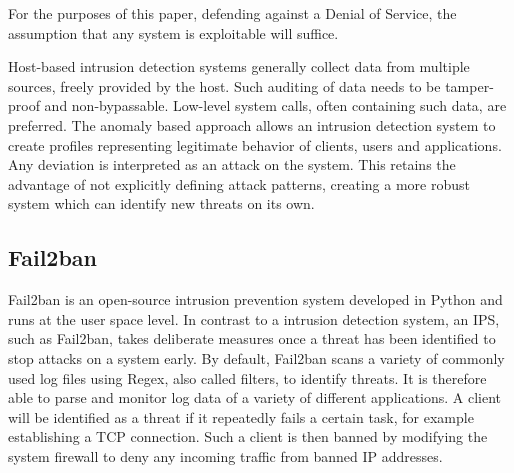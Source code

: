 For the purposes of this paper, defending against a Denial of Service, the assumption that any system is exploitable will suffice.

Host-based intrusion detection systems generally collect data from multiple sources, freely provided by the host.
Such auditing of data needs to be tamper-proof and non-bypassable.
Low-level system calls, often containing such data, are preferred.
The anomaly based approach allows an intrusion detection system to create profiles representing legitimate behavior of clients, users and applications.
Any deviation is interpreted as an attack on the system.
This retains the advantage of not explicitly defining attack patterns, creating a more robust system which can identify new threats on its own.\cite{HIDPS}

\subsection{Fail2ban}
Fail2ban is an open-source intrusion prevention system developed in Python and runs at the user space level.
In contrast to a intrusion detection system, an \ac{IPS}, such as Fail2ban, takes deliberate measures once a threat has been identified to stop attacks on a system early.
By default, Fail2ban scans a variety of commonly used log files using \ac{Regex}, also called filters, to identify threats.
It is therefore able to parse and monitor log data of a variety of different applications.
A client will be identified as a threat if it repeatedly fails a certain task, for example establishing a \ac{TCP} connection.
Such a client is then banned by modifying the system firewall to deny any incoming traffic from banned \ac{IP} addresses.\cite{git:fail2ban}

